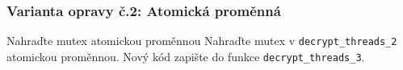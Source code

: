 \documentclass[usenames,dvipsnames,9pt]{beamer}
\begin{document}
{
\begin{frame}[fragile]
  \frametitle{Varianta opravy č.2: Atomická proměnná}
  
  \vspace{1em}
  \begin{block}{Nahraďte mutex atomickou proměnnou}
    Nahraďte mutex v \texttt{decrypt\_threads\_2} atomickou proměnnou.
    Nový kód zapište do funkce \texttt{decrypt\_threads\_3}.
  \end{block}
\end{frame}
}


 
 
  
  
  
  


\end{document}
